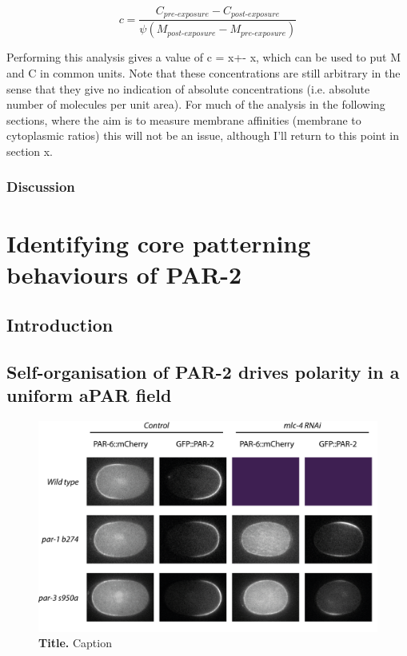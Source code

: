 \documentclass[12pt]{"article"}
\newcommand{\mycaption}[2]{\caption[#1]{\textbf{#1.} #2}}
\begin{document}
\begin{equation}
c = \frac{C_{pre \textrm{-} exposure} - C_{post  \textrm{-} exposure}}{\psi (M_{post  \textrm{-} exposure} - M_{pre  \textrm{-} exposure})}
\label{eq:c}
\end{equation}

Performing this analysis gives a value of c = x+- x, which can be used to put M and C in common units. Note that these concentrations are still arbitrary in the sense that they give no indication of absolute concentrations (i.e. absolute number of molecules per unit area). For much of the analysis in the following sections, where the aim is to measure membrane affinities (membrane to cytoplasmic ratios) this will not be an issue, although I’ll return to this point in section x.\\


\clearpage
\subsubsection{Discussion}

\clearpage
\section{Identifying core patterning behaviours of PAR-2}

\subsection{Introduction}


\subsection{Self-organisation of PAR-2 drives polarity in a uniform aPAR field}

\begin{figure}[!h]
\includegraphics[scale=0.9]{uniform_polarity}
\setlength{\abovecaptionskip}{20pt}
\centering
\mycaption{Title}{Caption}
\label{fig:uniform_polarity}
\end{figure}
\end{document}
